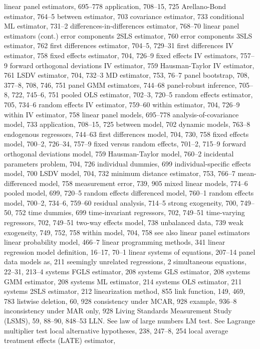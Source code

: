 linear panel estimators, 695–778
application, 708–15, 725
Arellano-Bond estimator, 764–5
between estimator, 703
covariance estimator, 733
conditional ML estimator, 731–2 differences-in-differences estimator, 768–70
linear panel estimators (cont.)
error components 2SLS estimator, 760
error components 3SLS estimator, 762
first differences estimator, 704–5, 729–31
first differences IV estimator, 758
fixed effects estimator, 704, 726–9
fixed effects IV estimators, 757–9
forward orthogonal deviations IV estimator, 759 Hausman-Taylor IV estimator, 761
LSDV estimator, 704, 732–3
MD estimator, 753, 76–7
panel bootstrap, 708, 377–8, 708, 746, 751 panel GMM estimators, 744–68
panel-robust inference, 705–8, 722, 745–6, 751 pooled OLS estimator, 702–3, 720–5
random effects estimator, 705, 734–6
random effects IV estimator, 759–60
within estimator, 704, 726–9
within IV estimator, 758
linear panel models, 695–778 analysis-of-covariance model, 733 application, 708–15, 725
between model, 702
dynamic models, 763–8
endogenous regressors, 744–63
first differences model, 704, 730, 758
fixed effects model, 700–2, 726–34, 757–9 fixed versus random effects, 701–2, 715–9 forward orthogonal deviations model, 759 Hausman-Taylor model, 760–2
incidental parameters problem, 704, 726 individual dummies, 699
individual-specific effects model, 700
LSDV model, 704, 732
minimum distance estimator, 753, 766–7 mean-differenced model, 758
measurement error, 739, 905
mixed linear models, 774–6
pooled model, 699, 720–5
random effects differenced model, 760–1 random effects model, 700–2, 734–6, 759–60 residual analysis, 714–5
strong exogeneity, 700, 749–50, 752
time dummies, 699
time-invariant regressors, 702, 749–51 time-varying regressors, 702, 749–51 two-way effects model, 738
unbalanced data, 739
weak exogeneity, 749, 752, 758
within model, 704, 758
see also linear panel estimators
linear probability model, 466–7 linear programming methods, 341 linear regression model
definition, 16–17, 70–1
linear systems of equations, 207–14
panel data models as, 211
seemingly unrelated regressions, 2
simultaneous equations, 22–31, 213–4 systems FGLS estimator, 208
systems GLS estimator, 208
systems GMM estimator, 208
systems ML estimator, 214 systems OLS estimator, 211 systems 2SLS estimator, 212
linearization method, 855 link function, 149, 469, 783 listwise deletion, 60, 928
consistency under MCAR, 928 example, 936–8
inconsistency under MAR only, 928
Living Standards Measurement Study (LSMS), 59, 88–90, 848–53
LLN. See law of large numbers
LM test. See Lagrange multiplier test
local alternative hypotheses, 238, 247–8, 254 local average treatment effects (LATE) estimator,

